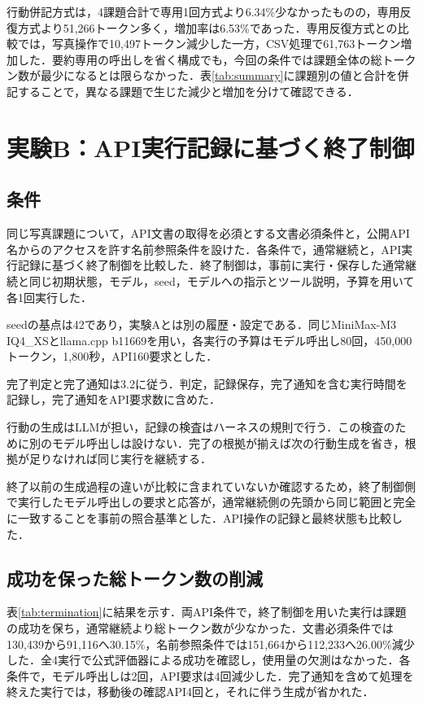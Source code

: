 \documentclass[letter]{ieicej}
\begin{document}
行動併記方式は，4課題合計で専用1回方式より6.34\%少なかったものの，専用反復方式より51,266トークン多く，増加率は6.53\%であった．専用反復方式との比較では，写真操作で10,497トークン減少した一方，CSV処理で61,763トークン増加した．要約専用の呼出しを省く構成でも，今回の条件では課題全体の総トークン数が最少になるとは限らなかった．表\ref{tab:summary}に課題別の値と合計を併記することで，異なる課題で生じた減少と増加を分けて確認できる．

\section{実験B：API実行記録に基づく終了制御}

\subsection{条件}

同じ写真課題について，API文書の取得を必須とする文書必須条件と，公開API名からのアクセスを許す名前参照条件を設けた．各条件で，通常継続と，API実行記録に基づく終了制御を比較した．終了制御は，事前に実行・保存した通常継続と同じ初期状態，モデル，seed，モデルへの指示とツール説明，予算を用いて各1回実行した．

seedの基点は42であり，実験Aとは別の履歴・設定である．同じMiniMax-M3 IQ4\_XSとllama.cpp b11669を用い，各実行の予算はモデル呼出し80回，450,000トークン，1,800秒，API160要求とした．

完了判定と完了通知は3.2に従う．判定，記録保存，完了通知を含む実行時間を記録し，完了通知をAPI要求数に含めた．

行動の生成はLLMが担い，記録の検査はハーネスの規則で行う．この検査のために別のモデル呼出しは設けない．完了の根拠が揃えば次の行動生成を省き，根拠が足りなければ同じ実行を継続する．

終了以前の生成過程の違いが比較に含まれていないか確認するため，終了制御側で実行したモデル呼出しの要求と応答が，通常継続側の先頭から同じ範囲と完全に一致することを事前の照合基準とした．API操作の記録と最終状態も比較した．

\subsection{成功を保った総トークン数の削減}

表\ref{tab:termination}に結果を示す．両API条件で，終了制御を用いた実行は課題の成功を保ち，通常継続より総トークン数が少なかった．文書必須条件では130,439から91,116へ30.15\%，名前参照条件では151,664から112,233へ26.00\%減少した．全4実行で公式評価器による成功を確認し，使用量の欠測はなかった．各条件で，モデル呼出しは2回，API要求は4回減少した．完了通知を含めて処理を終えた実行では，移動後の確認API4回と，それに伴う生成が省かれた．
\end{document}
